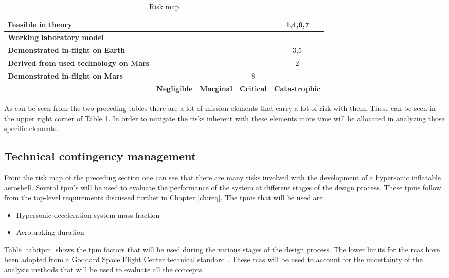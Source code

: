 \begin{table}[h]
\centering
\caption{Risk map}
\label{tab:riskmap}
    \begin{tabular}{|p{6.5cm}|c|c|c|c|}
    \hline
    \textbf{Feasible in theory} & \cellcolor{green} & \cellcolor{yellow} & \cellcolor{red} & \cellcolor{red} 1,4,6,7 \\ \hline
    \textbf{Working laboratory model} & \cellcolor{green} & \cellcolor{yellow} & \cellcolor{red} & \cellcolor{red} \\ \hline
    \textbf{Demonstrated in-flight on Earth} & \cellcolor{green} & \cellcolor{yellow} & \cellcolor{yellow} & \cellcolor{yellow} 3,5 \\ \hline
    \textbf{Derived from used technology on Mars} & \cellcolor{green} & \cellcolor{yellow} & \cellcolor{yellow} & \cellcolor{yellow} 2 \\ \hline
    \textbf{Demonstrated in-flight on Mars} & \cellcolor{green} & \cellcolor{green} & \cellcolor{green} 8 & \cellcolor{green} \\ \hline
     & \textbf{Negligible} & \textbf{Marginal} & \textbf{Critical} & \textbf{Catastrophic} \\ \hline
    \end{tabular}
\end{table}

As can be seen from the two preceding tables there are a lot of mission elements that carry a lot of risk with them. These can be seen in the upper right corner of Table \ref{tab:riskmap}. In order to mitigate the risks inherent with these elements more time will be allocated in analyzing those specific elements.

\subsection{Technical contingency management}
\label{sec:tca}
From the risk map of the preceding section one can see that there are many risks involved with the development of a hypersonic inflatable aeroshell. Several \gls{tpm}'s  will be used to evaluate the performance of the system at different stages of the design process. These \gls{tpm}s follow from the top-level requirements discussed further in Chapter \ref{ch:req}. The \gls{tpm}s that will be used are:
\begin{itemize}
	\item Hypersonic deceleration system mass fraction
	\item Aerobraking duration
\end{itemize}
Table \ref{tab:tpm} shows the \gls{tpm} factors that will be used during the various stages of the design process. The lower limits for the \gls{rca}s have been adopted from a Goddard Space Flight Center technical standard \cite{GoddardSpaceFlightCenter2013}. These \gls{rca}s will be used to account for the uncertainty of the analysis methods that will be used to evaluate all the concepts.

